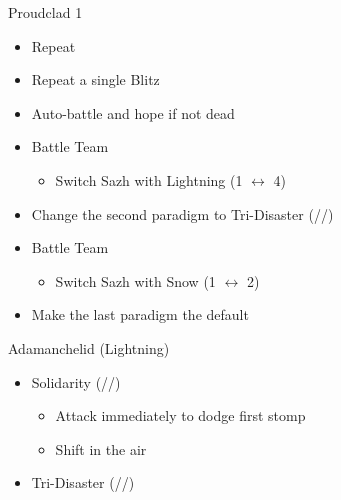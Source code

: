 \begin{paracol}{2}
\begin{battle}{Proudclad 1}
\begin{itemize}
\begin{itemize}
			      \item Repeat
			      \item Repeat a single Blitz
			      \item Auto-battle and hope if not dead
		      \end{itemize}
	\end{itemize}
\end{battle}
\switchcolumn*
\begin{menu}
	\begin{itemize}
		\paradigm
		\begin{itemize}
			\item Battle Team
			      \begin{itemize}
				      \item Switch Sazh with Lightning (1 $\leftrightarrow$ 4)
			      \end{itemize}
			\item Change the second paradigm to Tri-Disaster (\rav/\rav/\rav)
		\end{itemize}
	\end{itemize}
\end{menu}
\switchcolumn
\begin{menu}
	\begin{itemize}
		\paradigm
		\begin{itemize}
			\item Battle Team
			      \begin{itemize}
				      \item Switch Sazh with Snow (1 $\leftrightarrow$ 2)
			      \end{itemize}
			\item Make the last paradigm the default
		\end{itemize}
	\end{itemize}
\end{menu}
\switchcolumn*
\begin{battle}{Adamanchelid (Lightning)}
	\renewcommand{\first}{[1] Solidarity (\com/\sen/\med)}
	\renewcommand{\second}{[2] Tri-Disaster (\rav/\rav/\rav)}
	\begin{itemize}
		\item \first
		      \begin{itemize}
			      \item Attack immediately to dodge first stomp
			      \item Shift in the air
		      \end{itemize}
		\item \second
		      \begin{itemize}

\end{itemize}
\end{itemize}
\end{battle}
\end{paracol}
